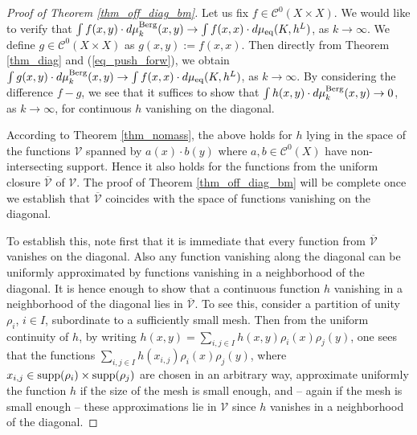 \documentclass[12pt]{article}
\numberwithin{equation}{section}
\theoremstyle{theorem}
\theoremstyle{definition}
\theoremstyle{remark}
\newcommand{\ccal}{\mathscr{C}}
\begin{document}
	\begin{proof}[Proof of Theorem \ref{thm_off_diag_bm}]
		Let us fix $f \in \ccal^0(X \times X)$.
		We would like to verify that $\int f(x, y) \cdot d \mu_k^{\rm{Berg}}(x, y) \to \int f(x, x) \cdot d \mu_{\mathrm{eq}}(K, h^L)$, as $k \to \infty$.
		We define $g \in \ccal^0(X \times X)$ as $g(x, y) := f(x, x)$.
		Then directly from Theorem \ref{thm_diag} and (\ref{eq_push_forw}), we obtain $\int g(x, y) \cdot d \mu_k^{\rm{Berg}}(x, y) \to \int f(x, x) \cdot d \mu_{\mathrm{eq}}(K, h^L)$, as $k \to \infty$.
		By considering the difference $f - g$, we see that it suffices to show that $\int h(x, y) \cdot d \mu_k^{\rm{Berg}}(x, y) \to 0$, as $k \to \infty$, for continuous $h$ vanishing on the diagonal.
		\par 
		According to Theorem \ref{thm_nomass}, the above holds for $h$ lying in the space of the functions $\mathcal{V}$ spanned by $a(x) \cdot b(y)$ where $a, b \in \ccal^0(X)$ have non-intersecting support.
		Hence it also holds for the functions from the uniform closure $\overline{\mathcal{V}}$ of $\mathcal{V}$.
		The proof of Theorem \ref{thm_off_diag_bm} will be complete once we establish that $\overline{\mathcal{V}}$ coincides with the space of functions vanishing on the diagonal.
		\par 
		To establish this, note first that it is immediate that every function from $\overline{\mathcal{V}}$ vanishes on the diagonal.
		Also any function vanishing along the diagonal can be uniformly approximated by functions vanishing in a neighborhood of the diagonal.
		It is hence enough to show that a continuous function $h$ vanishing in a neighborhood of the diagonal lies in $\overline{\mathcal{V}}$.
		To see this, consider a partition of unity $\rho_i$, $i \in I$, subordinate to a sufficiently small mesh.
		Then from the uniform continuity of $h$, by writing $h(x, y) = \sum_{i, j \in I} h(x, y) \rho_i(x) \rho_j(y)$, one sees that the functions $\sum_{i, j \in I} h(x_{i, j}) \rho_i(x) \rho_j(y)$, where $x_{i, j} \in {\rm{supp}} (\rho_i) \times {\rm{supp}} (\rho_j)$ are chosen in an arbitrary way, approximate uniformly the function $h$ if the size of the mesh is small enough, and -- again if the mesh is small enough -- these approximations lie in $\mathcal{V}$ since $h$ vanishes in a neighborhood of the diagonal.
	\end{proof}
	
	
\end{document}
